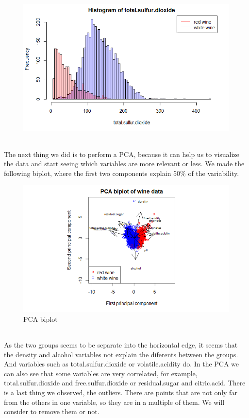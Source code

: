 \documentclass[10pt]{article}
\begin{document}
\begin{figure}[H]
\includegraphics[scale=0.4]{histogram_of_totalsulfurdioxide}
\end{figure}
\ \\
The next thing we did is to perform a PCA, because it can help us to visualize the data and start seeing which variables are more relevant or less. We made the following biplot, where the first two components explain 50\% of the variability. \\
\begin{figure}[H]
\centering
\caption{PCA biplot}
\includegraphics[scale=0.75]{PCA_biplot}
\end{figure}
\ \\
As the two groups seems to be separate into the horizontal edge, it seems that the density and alcohol variables not explain the diferents between the groups. And variables such as total.sulfur.dioxide or volatile.acidity do. In the PCA we can also see that some variables are very correlated, for example, total.sulfur.dioxide and free.sulfur.dioxide or residual.sugar and citric.acid. There is a last thing we observed, the outliers. There are points that are not only far from the others in one variable, so they are in a multiple of them. We will consider to remove them or not.   \\ \ \\
\end{document}

